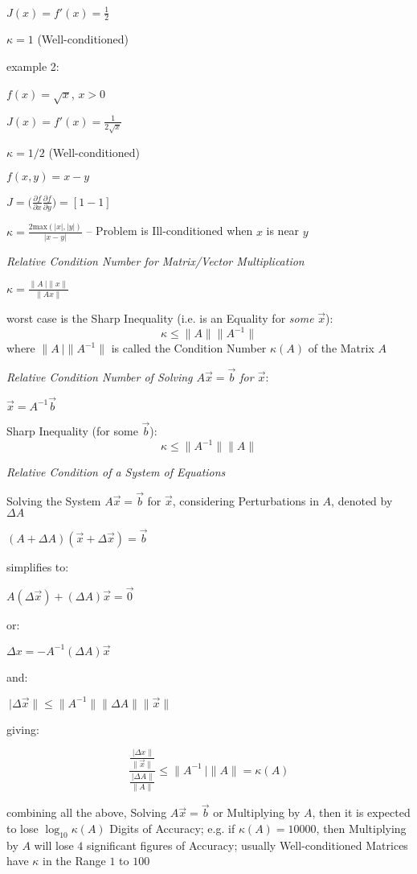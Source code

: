 $J(x) = f'(x) = \frac{1}{2}$

$\kappa = 1$ (Well-conditioned)

example 2:

$f(x) = \sqrt x$, $x > 0$

$J(x) = f'(x) = \frac{1}{2\sqrt{x}}$

$\kappa = 1/2$ (Well-conditioned)

$f(x,y) = x - y$

$J = \Big(
  \frac{\partial{f}}{\partial{x}}
  \frac{\partial{f}}{\partial{y}}
\Big) = [1 -1]$

$\kappa = \frac{2 \mathrm{max}(|x|,|y|)}{|x - y|}$ --
Problem is Ill-conditioned when $x$ is near $y$


\emph{Relative Condition Number for Matrix/Vector Multiplication}

$\kappa = \frac{\|A\ |\|x\|}{\|Ax\|}$

worst case is the Sharp Inequality (i.e. is an Equality for \emph{some}
$\vec{x}$):
\[
  \kappa \leq \|A\| \|A^{-1}\|
\]
where $\|A\ |\|A^{-1}\|$ is called the Condition Number $\kappa(A)$ of the
Matrix $A$


\emph{Relative Condition Number of Solving $A\vec{x} = \vec{b}$ for $\vec{x}$}:

$\vec{x} = A^{-1}\vec{b}$

Sharp Inequality (for some $\vec{b}$):
\[
  \kappa \leq \|A^{-1}\| \|A\|
\]


\emph{Relative Condition of a System of Equations}

Solving the System $A\vec{x} = \vec{b}$ for $\vec{x}$, considering
Perturbations in $A$, denoted by $\Delta A$

$(A + \Delta A)(\vec{x} + \Delta\vec{x}) = \vec{b}$

simplifies to:

$A(\Delta\vec{x}) + (\Delta A)\vec{x} = \vec{0}$

or:

$\Delta x = -A^{-1}(\Delta A)\vec{x}$

and:

$\ |\Delta\vec{x}\| \leq \|A^{-1}\| \|\Delta{A}\| \|\vec{x}\|$

giving:

\[
  \frac{
    \frac{\ |\Delta{x}\|}{\|\vec{x}\|}
  }{
    \frac{\ |\Delta{A}\|}{\|A\|}
  }
  \leq \|A^{-1}\ |\|A\| = \kappa(A)
\]

combining all the above, Solving $A\vec{x} = \vec{b}$ or Multiplying by $A$,
then it is expected to lose $\log_{10} \kappa(A)$ Digits of Accuracy; e.g. if
$\kappa(A) = 10000$, then Multiplying by $A$ will lose $4$ significant figures
of Accuracy; usually Well-conditioned Matrices have $\kappa$ in the Range $1$
to $100$




